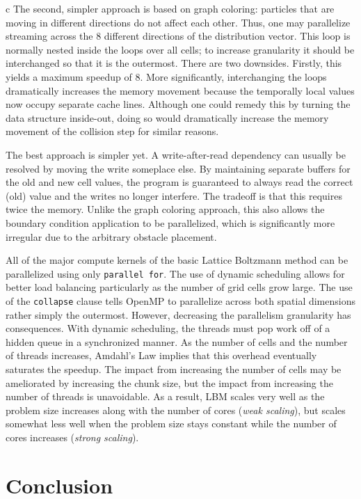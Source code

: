 \documentclass[conference, a4paper]{IEEEtran-modified}
\begin{document}
\begin{ccode}[]{c}
The second, simpler approach is based on graph coloring: particles that are moving in different directions do not affect each other. Thus, one may parallelize streaming across the 8 different directions of the distribution vector. This loop is normally nested inside the loops over all cells; to increase granularity it should be interchanged so that it is the outermost. There are two downsides. Firstly, this yields a maximum speedup of 8. More significantly, interchanging the loops dramatically increases the memory movement because the temporally local values now occupy separate cache lines. Although one could remedy this by turning the data structure inside-out, doing so would dramatically increase the memory movement of the collision step for similar reasons. 

The best approach is simpler yet. A write-after-read dependency can usually be resolved by moving the write someplace else. By maintaining separate buffers for the old and new cell values, the program is guaranteed to always read the correct (old) value and the writes no longer interfere. The tradeoff is that this requires twice the memory. Unlike the graph coloring approach, this also allows the boundary condition application to be parallelized, which is significantly more irregular due to the arbitrary obstacle placement.

All of the major compute kernels of the basic Lattice Boltzmann method can be parallelized using only \texttt{parallel for}. The use of dynamic scheduling allows for better load balancing particularly as the number of grid cells grow large. The use of the \texttt{collapse} clause tells OpenMP to parallelize across both spatial dimensions rather simply the outermost. However, decreasing the parallelism granularity has consequences. With dynamic scheduling, the threads must pop work off of a hidden queue in a synchronized manner. As the number of cells and the number of threads increases, Amdahl's Law implies that this overhead eventually saturates the speedup. The impact from increasing the number of cells may be ameliorated by increasing the chunk size, but the impact from increasing the number of threads is unavoidable. As a result, LBM scales very well as the problem size increases along with the number of cores (\emph{weak scaling}), but scales somewhat less well when the problem size stays constant while the number of cores increases (\emph{strong scaling}). 

\section{Conclusion}


\end{ccode}
\end{document}
